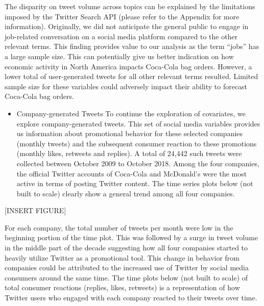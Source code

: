 \documentclass[12pt,oneside]{chicagocapstone}
\providecommand{\tightlist}{%
  \setlength{\itemsep}{0pt}\setlength{\parskip}{0pt}}
\begin{document}
The disparity on tweet volume across topics can be explained by the limitations imposed by the Twitter Search API (please refer to the Appendix for more information). Originally, we did not anticipate the general public to engage in job-related conversation on a social media platform compared to the other relevant terms. This finding provides value to our analysis as the term ``jobs'' has a large sample size. This can potentially give us better indication on how economic activity in North America impacts Coca-Cola bag orders. However, a lower total of user-generated tweets for all other relevant terms resulted. Limited sample size for these variables could adversely impact their ability to forecast Coca-Cola bag orders.
\begin{itemize}
\tightlist
\item
  Company-generated Tweets
  To continue the exploration of covariates, we explore company-generated tweets. This set of social media variables provides us information about promotional behavior for these selected companies (monthly tweets) and the subsequent consumer reaction to these promotions (monthly likes, retweets and replies). A total of 24,442 such tweets were collected between October 2009 to October 2018. Among the four companies, the official Twitter accounts of Coca-Cola and McDonald's were the most active in terms of posting Twitter content. The time series plots below (not built to scale) clearly show a general trend among all four companies.
\end{itemize}
{[}INSERT FIGURE{]}

For each company, the total number of tweets per month were low in the beginning portion of the time plot. This was followed by a surge in tweet volume in the middle part of the decade suggesting how all four companies started to heavily utilize Twitter as a promotional tool. This change in behavior from companies could be attributed to the increased use of Twitter by social media consumers around the same time. The time plots below (not built to scale) of total consumer reactions (replies, likes, retweets) is a representation of how Twitter users who engaged with each company reacted to their tweets over time.
\end{document}
